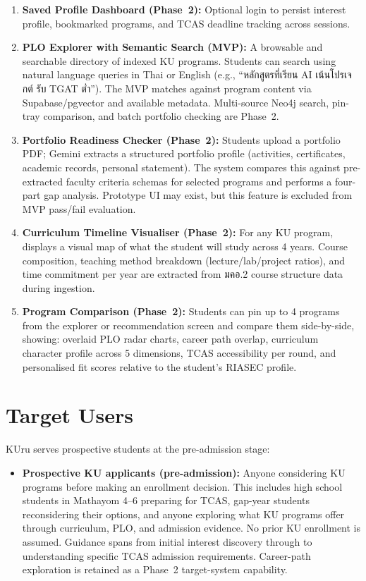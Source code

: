\begin{enumerate}[leftmargin=80pt]
    \item \textbf{Saved Profile Dashboard (Phase~2):} Optional login to persist interest profile, bookmarked programs, and TCAS deadline tracking across sessions.

    \item \textbf{PLO Explorer with Semantic Search (MVP):} A browsable and searchable directory of indexed KU programs. Students can search using natural language queries in Thai or English (e.g., ``หลักสูตรที่เรียน AI เน้นโปรเจกต์ รับ TGAT ต่ำ''). The MVP matches against program content via Supabase/pgvector and available metadata. Multi-source Neo4j search, pin-tray comparison, and batch portfolio checking are Phase~2.

    \item \textbf{Portfolio Readiness Checker (Phase~2):} Students upload a portfolio PDF; Gemini extracts a structured portfolio profile (activities, certificates, academic records, personal statement). The system compares this against pre-extracted faculty criteria schemas for selected programs and performs a four-part gap analysis. Prototype UI may exist, but this feature is excluded from MVP pass/fail evaluation.

    \item \textbf{Curriculum Timeline Visualiser (Phase~2):} For any KU program, displays a visual map of what the student will study across 4 years. Course composition, teaching method breakdown (lecture/lab/project ratios), and time commitment per year are extracted from มคอ.2 course structure data during ingestion.

    \item \textbf{Program Comparison (Phase~2):} Students can pin up to 4 programs from the explorer or recommendation screen and compare them side-by-side, showing: overlaid PLO radar charts, career path overlap, curriculum character profile across 5 dimensions, TCAS accessibility per round, and personalised fit scores relative to the student's RIASEC profile.
\end{enumerate}

\section{Target Users}
\label{section:target-users}

KUru serves prospective students at the pre-admission stage:

\begin{itemize}[leftmargin=80pt]
    \item \textbf{Prospective KU applicants (pre-admission):} Anyone considering KU programs before making an enrollment decision. This includes high school students in Mathayom 4--6 preparing for TCAS, gap-year students reconsidering their options, and anyone exploring what KU programs offer through curriculum, PLO, and admission evidence. No prior KU enrollment is assumed. Guidance spans from initial interest discovery through to understanding specific TCAS admission requirements. Career-path exploration is retained as a Phase~2 target-system capability.
\end{itemize}

